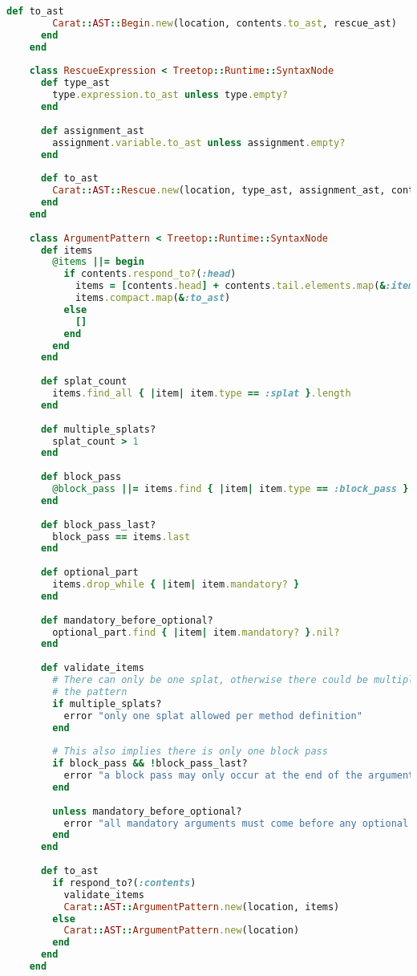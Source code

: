 \begin{lstlisting}[title={\small\Helvetica parser/nodes.rb},language=Ruby]
      def to_ast
        Carat::AST::Begin.new(location, contents.to_ast, rescue_ast)
      end
    end
    
    class RescueExpression < Treetop::Runtime::SyntaxNode
      def type_ast
        type.expression.to_ast unless type.empty?
      end
      
      def assignment_ast
        assignment.variable.to_ast unless assignment.empty?
      end
      
      def to_ast
        Carat::AST::Rescue.new(location, type_ast, assignment_ast, contents.to_ast)
      end
    end
    
    class ArgumentPattern < Treetop::Runtime::SyntaxNode
      def items
        @items ||= begin
          if contents.respond_to?(:head)
            items = [contents.head] + contents.tail.elements.map(&:item)
            items.compact.map(&:to_ast)
          else
            []
          end
        end
      end
      
      def splat_count
        items.find_all { |item| item.type == :splat }.length
      end
      
      def multiple_splats?
        splat_count > 1
      end
      
      def block_pass
        @block_pass ||= items.find { |item| item.type == :block_pass }
      end
      
      def block_pass_last?
        block_pass == items.last
      end
      
      def optional_part
        items.drop_while { |item| item.mandatory? }
      end
      
      def mandatory_before_optional?
        optional_part.find { |item| item.mandatory? }.nil?
      end
      
      def validate_items
        # There can only be one splat, otherwise there could be multiple ways to map arguments onto
        # the pattern
        if multiple_splats?
          error "only one splat allowed per method definition"
        end
        
        # This also implies there is only one block pass
        if block_pass && !block_pass_last?
          error "a block pass may only occur at the end of the argument list in a method definition"
        end
        
        unless mandatory_before_optional?
          error "all mandatory arguments must come before any optional ones"
        end
      end
      
      def to_ast
        if respond_to?(:contents)
          validate_items
          Carat::AST::ArgumentPattern.new(location, items)
        else
          Carat::AST::ArgumentPattern.new(location)
        end
      end
    end
    

\end{lstlisting}
